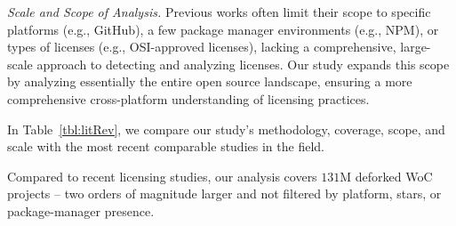 \textit{Scale and Scope of Analysis.} 
Previous works often limit their scope to specific platforms (e.g., GitHub), a few package manager environments (e.g., NPM), or types of licenses (e.g., OSI-approved licenses), lacking a comprehensive, large-scale approach to detecting and analyzing licenses.
Our study expands this scope by analyzing essentially the entire open source landscape, ensuring a more comprehensive cross-platform understanding of licensing practices.

In Table~\ref{tbl:litRev}, we compare our study's
methodology, coverage, scope, and scale with the most recent
comparable studies in the field.

\begin{table}[ht]
  \vspace{-.15in}
  \centering
\caption{Latest Studies in Open Source Software Licensing}
\label{tbl:litRev}
\vspace{-.1in}
\vspace{-.15in}
\end{table}

Compared to recent licensing studies, our analysis
covers $131$M deforked WoC projects -- two orders of magnitude
larger and not filtered by platform, stars, or package-manager
presence.
